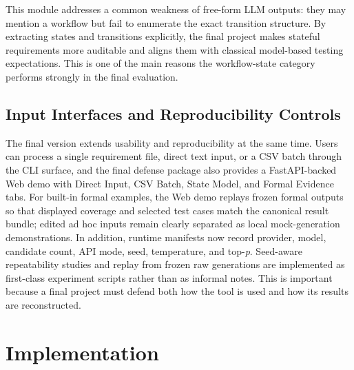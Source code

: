 \documentclass{article}
\begin{document}
This module addresses a common weakness of free-form LLM outputs: they may mention a workflow but fail to enumerate the exact transition structure. By extracting states and transitions explicitly, the final project makes stateful requirements more auditable and aligns them with classical model-based testing expectations. This is one of the main reasons the workflow-state category performs strongly in the final evaluation.

\subsection{Input Interfaces and Reproducibility Controls}
The final version extends usability and reproducibility at the same time. Users can process a single requirement file, direct text input, or a CSV batch through the CLI surface, and the final defense package also provides a FastAPI-backed Web demo with Direct Input, CSV Batch, State Model, and Formal Evidence tabs. For built-in formal examples, the Web demo replays frozen formal outputs so that displayed coverage and selected test cases match the canonical result bundle; edited ad hoc inputs remain clearly separated as local mock-generation demonstrations. In addition, runtime manifests now record provider, model, candidate count, API mode, seed, temperature, and top-\textit{p}. Seed-aware repeatability studies and replay from frozen raw generations are implemented as first-class experiment scripts rather than as informal notes. This is important because a final project must defend both how the tool is used and how its results are reconstructed.

\section{Implementation}
\end{document}
